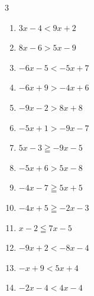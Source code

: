 \begin{multicols}{3}
\begin{enumerate}
  \item $3x-4<9x+2$

        \phantom{$\displaystyle x>-1$}

  \item $8x-6>5x-9$

        \phantom{$\displaystyle x>-1$}

  \item $-6x-5<-5x+7$

        \phantom{$\displaystyle x>-12$}

  \item $-6x+9>-4x+6$


  \item $-9x-2>8x+8$


  \item $-5x+1>-9x-7$

        \phantom{$\displaystyle x>-2$}

  \item $5x-3\geqq -9x-5$


  \item $-5x+6>5x-8$


  \item $-4x-7\geqq 5x+5$


  \item $-4x+5\geqq -2x-3$

        \phantom{$\displaystyle x\leqq 4$}

  \item $x-2\leqq 7x-5$


  \item $-9x+2<-8x-4$

        \phantom{$\displaystyle x>6$}

  \item $-x+9<5x+4$


  \item $-2x-4<4x-4$

        \phantom{$\displaystyle x>0$}


\end{enumerate}
\end{multicols}
